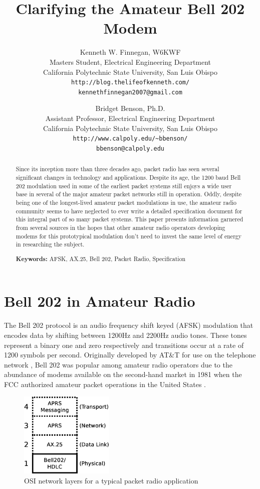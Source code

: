 \documentclass[12pt,letterpaper]{article}
\title{Clarifying the Amateur Bell 202 Modem}
\author{Kenneth W. Finnegan, W6KWF\\
\small Masters Student, Electrical Engineering Department\\
\small California Polytechnic State University, San Luis Obispo\\
\small \texttt{http://blog.thelifeofkenneth.com/}\\
\small \texttt{kennethfinnegan2007@gmail.com}\\
\and
Bridget Benson, Ph.D.\\
\small Assistant Professor, Electrical Engineering Department\\
\small California Polytechnic State University, San Luis Obispo\\
\small \texttt{http://www.calpoly.edu/\textasciitilde{}bbenson/}\\
\small \texttt{bbenson@calpoly.edu}}
\begin{document}
\maketitle

\begin{abstract}
	Since its inception more than three decades ago, 
	packet radio has seen several significant changes in technology
	and applications. 
	Despite its age, the 1200 baud Bell 202 modulation used in some
	of the earliest packet systems still enjoys a wide user base
	in several of the major amateur packet networks still in operation.
	Oddly, despite being one of the longest-lived amateur packet modulations in use,
	the amateur radio community seems to have neglected to ever write a detailed
	specification document for this integral part of so many packet systems.
	This paper presents information garnered from several sources
	in the hopes that other amateur radio operators developing modems for 
	this prototypical modulation
	don't need to invest the same level of energy in researching the subject.
	
	
	\textbf{Keywords:} AFSK, AX.25, Bell 202, Packet Radio, Specification
\end{abstract}


\section{Bell 202 in Amateur Radio}
\label{sec:bell202history}

The Bell 202 protocol is an audio frequency shift keyed (AFSK) modulation that
encodes data by shifting between 1200Hz and 2200Hz audio tones.
These tones represent a binary one and zero respectively and transitions occur
at a rate of 1200 symbols per second.
Originally developed by AT\&T for use on the telephone network \cite{202tspec},
Bell 202 was popular among amateur radio operators due to the abundance
of modems available on the second-hand market in 1981 when the FCC authorized
amateur packet operations in the United States \cite{gatewaypacket}.

\begin{figure}
	\centering
	\includegraphics[width=0.4\textwidth]{src/dia/osi_bell202}
	\caption{OSI network layers for a typical packet radio application}
	\label{fig:osibell}
\end{figure}
\end{document}
